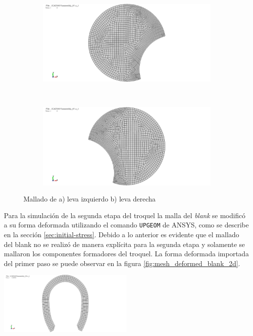 \begin{figure}[H]
\centering
\begin{subfigure}[t]{0.4\textwidth}
	\centering
	\includegraphics[width=\textwidth]{src/ch3/mesh_leva_izq_2d.png}
	\caption{}
	\label{fig:mesh_leva_izq_2d}
\end{subfigure}
~ 
\begin{subfigure}[t]{0.4\textwidth}
	\centering
	\includegraphics[width=\textwidth]{src/ch3/mesh_leva_der_2d.png}
	\caption{}
	\label{fig:mesh_leva_der_2d}
\end{subfigure}
\caption{Mallado de a) leva izquierdo b) leva derecha}
\end{figure}


Para la simulación de la segunda etapa del troquel la malla del \textit{blank} se modificó a su forma deformada 
utilizando el comando \texttt{UPGEOM} de ANSYS\faCopyright, como se describe en la sección \ref{sec:initial-stress}. 
Debido a lo anterior es evidente que el mallado del blank no se realizó de manera explícita para la segunda etapa 
y solamente se mallaron los componentes formadores del troquel. La forma deformada importada del primer paso 
se puede observar en la figura \ref{fig:mesh_deformed_blank_2d}.  \\


\begin{center}
\includegraphics[width=0.5\textwidth]{src/ch3/mesh_deformed_blank_2d.png}
\label{fig:mesh_deformed_blank_2d}
\end{center}


